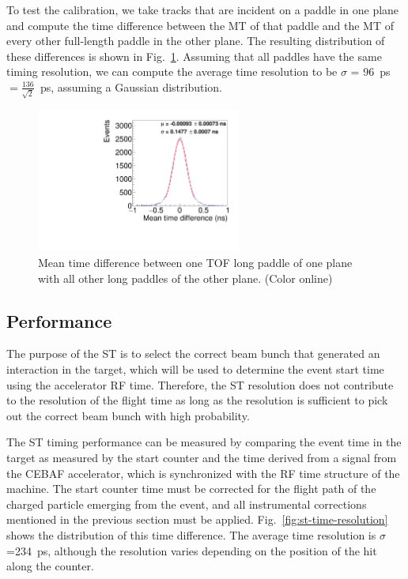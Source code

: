 To test the calibration, we take tracks that are incident on a paddle in one plane and compute the time difference between the MT of that paddle and the MT of every other full-length paddle in the other plane. The resulting distribution of these differences is shown in Fig.~\ref{fig:mt_diff}. Assuming that all paddles have the same timing resolution, we can compute the
average time resolution to be $\sigma$ = 96~ps$=\frac{136}{\sqrt{2}}$~ps, assuming a Gaussian distribution.
\begin{figure}[tbp]
\begin{center}
\includegraphics[width=0.6\textwidth]{figures/mt_diff_fullTOF.pdf}
\caption{\label{fig:mt_diff} Mean time difference between one TOF long paddle of one plane with all other long paddles
of the other plane. (Color online)}
\end{center}
\end{figure}

\subsection{Performance \label{sec:scperformance}}
The purpose of the ST is to select the correct beam bunch that generated an interaction in the target, which will be used to determine the event start time using the accelerator RF time. Therefore, the ST resolution does not contribute to the resolution of the flight time as long as the resolution is sufficient to pick out the correct beam bunch with high probability.

The ST timing performance can be measured by comparing the event time in the target as measured by the start counter and the time derived from a signal from the CEBAF accelerator, which is synchronized with the RF time structure of the machine. The start counter time must be corrected for the flight path of the charged particle emerging from the event, and all instrumental corrections mentioned in the previous section must be applied. Fig.~\ref{fig:st-time-resolution} shows the distribution of this time difference. The average time resolution is $\sigma$=234~ps, although the resolution varies depending on the position of the hit along the counter. 

